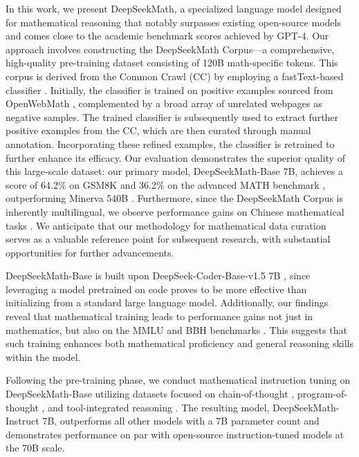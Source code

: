 In this work, we present DeepSeekMath, a specialized language model designed for mathematical reasoning that notably surpasses existing open-source models and comes close to the academic benchmark scores achieved by GPT-4. Our approach involves constructing the DeepSeekMath Corpus—a comprehensive, high-quality pre-training dataset consisting of 120B math-specific tokens. This corpus is derived from the Common Crawl (CC) by employing a fastText-based classifier \citep{joulin2016fasttext}. Initially, the classifier is trained on positive examples sourced from OpenWebMath \citep{openwebmath}, complemented by a broad array of unrelated webpages as negative samples. The trained classifier is subsequently used to extract further positive examples from the CC, which are then curated through manual annotation. Incorporating these refined examples, the classifier is retrained to further enhance its efficacy. Our evaluation demonstrates the superior quality of this large-scale dataset: our primary model, DeepSeekMath-Base 7B, achieves a score of 64.2\% on GSM8K \citep{gsm8k} and 36.2\% on the advanced MATH benchmark \citep{MATH}, outperforming Minerva 540B \citep{minerva}. Furthermore, since the DeepSeekMath Corpus is inherently multilingual, we observe performance gains on Chinese mathematical tasks \citep{wei2023cmath,agieval}. We anticipate that our methodology for mathematical data curation serves as a valuable reference point for subsequent research, with substantial opportunities for further advancements.

DeepSeekMath-Base is built upon DeepSeek-Coder-Base-v1.5 7B \citep{deepseek-coder}, since leveraging a model pretrained on code proves to be more effective than initializing from a standard large language model. Additionally, our findings reveal that mathematical training leads to performance gains not just in mathematics, but also on the MMLU \citep{mmlu} and BBH benchmarks \citep{bbh}. This suggests that such training enhances both mathematical proficiency and general reasoning skills within the model.

Following the pre-training phase, we conduct mathematical instruction tuning on DeepSeekMath-Base utilizing datasets focused on chain-of-thought \citep{cot}, program-of-thought \citep{pot,pal}, and tool-integrated reasoning \citep{tora}. The resulting model, DeepSeekMath-Instruct 7B, outperforms all other models with a 7B parameter count and demonstrates performance on par with open-source instruction-tuned models at the 70B scale.

